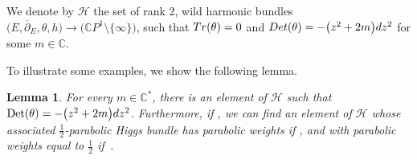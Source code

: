 \documentclass[11pt]{article}
\numberwithin{equation}{section}
\newtheorem{Lemma}[Theorem]{Lemma}
\numberwithin{equation}{section}
\newcommand{\CP}{\mathbb{C}P^1}
\begin{document}
\begin{Definition}
We denote by $\mathcal{H}$ the set of rank $2$, wild harmonic bundles $\bigl(E,\overline{\partial}_E,\theta,h\bigr)\to \bigl(\CP\setminus \{\infty\}\bigr)$, such that $\textnormal{Tr}(\theta)=0$ and $\textnormal{Det}(\theta)=-\bigl(z^2+2m\bigr){\rm d}z^2$ for some $m \in \mathbb{C}$.

\end{Definition}

To illustrate some examples, we show the following lemma.

\begin{Lemma}\label{C1} For every $m\in \mathbb{C}^*$, there is an element of $\mathcal{H}$ such that $\operatorname{Det}(\theta)=-\bigl(z^2+2m\bigr){\rm d}z^2$. Furthermore, if \smash{$m^{(3)}\in \bigl(-\frac12,\frac12\bigr]$}, we can find an element of $\mathcal{H}$ whose associated $\frac{1}{2}$-parabolic Higgs bundle has parabolic weights  if , and with parabolic weights equal to $\frac{1}{2}$ if~.
\end{Lemma}
\end{document}
